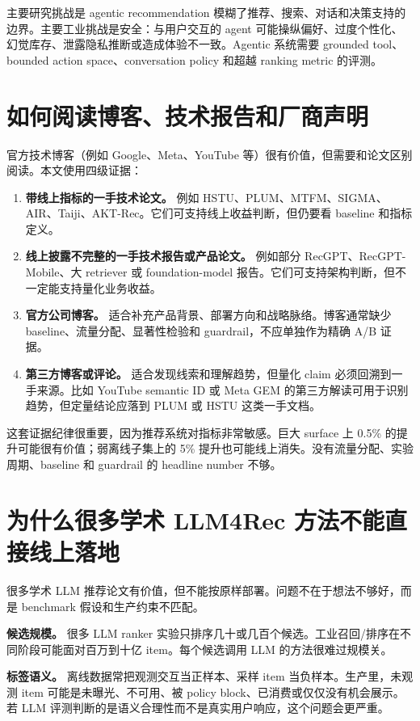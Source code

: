 \documentclass[UTF8,fontset=fandol,11pt]{ctexart}
\begin{document}
主要研究挑战是 agentic recommendation 模糊了推荐、搜索、对话和决策支持的边界。主要工业挑战是安全：与用户交互的 agent 可能操纵偏好、过度个性化、幻觉库存、泄露隐私推断或造成体验不一致。Agentic 系统需要 grounded tool、bounded action space、conversation policy 和超越 ranking metric 的评测。

\section{如何阅读博客、技术报告和厂商声明}

官方技术博客（例如 Google、Meta、YouTube 等）很有价值，但需要和论文区别阅读。本文使用四级证据：

\begin{enumerate}
  \item \textbf{带线上指标的一手技术论文。} 例如 HSTU、PLUM、MTFM、SIGMA、AIR、Taiji、AKT-Rec。它们可支持线上收益判断，但仍要看 baseline 和指标定义。
  \item \textbf{线上披露不完整的一手技术报告或产品论文。} 例如部分 RecGPT、RecGPT-Mobile、大 retriever 或 foundation-model 报告。它们可支持架构判断，但不一定能支持量化业务收益。
  \item \textbf{官方公司博客。} 适合补充产品背景、部署方向和战略脉络。博客通常缺少 baseline、流量分配、显著性检验和 guardrail，不应单独作为精确 A/B 证据。
  \item \textbf{第三方博客或评论。} 适合发现线索和理解趋势，但量化 claim 必须回溯到一手来源。比如 YouTube semantic ID 或 Meta GEM 的第三方解读可用于识别趋势，但定量结论应落到 PLUM 或 HSTU 这类一手文档。
\end{enumerate}

这套证据纪律很重要，因为推荐系统对指标非常敏感。巨大 surface 上 0.5\% 的提升可能很有价值；弱离线子集上的 5\% 提升也可能线上消失。没有流量分配、实验周期、baseline 和 guardrail 的 headline number 不够。

\section{为什么很多学术 LLM4Rec 方法不能直接线上落地}

很多学术 LLM 推荐论文有价值，但不能按原样部署。问题不在于想法不够好，而是 benchmark 假设和生产约束不匹配。

\textbf{候选规模。} 很多 LLM ranker 实验只排序几十或几百个候选。工业召回/排序在不同阶段可能面对百万到十亿 item。每个候选调用 LLM 的方法很难过规模关。

\textbf{标签语义。} 离线数据常把观测交互当正样本、采样 item 当负样本。生产里，未观测 item 可能是未曝光、不可用、被 policy block、已消费或仅仅没有机会展示。若 LLM 评测判断的是语义合理性而不是真实用户响应，这个问题会更严重。
\end{document}
